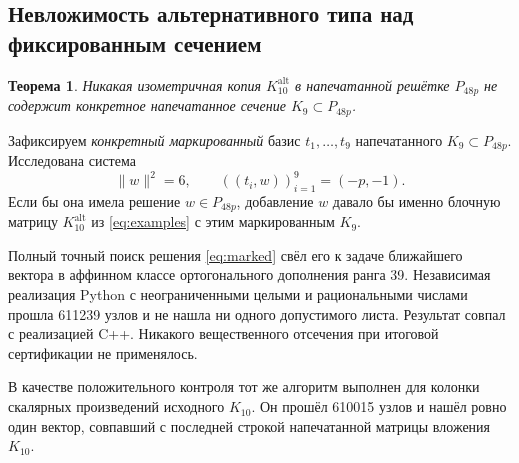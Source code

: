 \documentclass[11pt,a4paper]{article}
\newtheorem{theorem}{Теорема}[section]
\theoremstyle{remark}\newtheorem{remark}[theorem]{Замечание}
\newcommand{\Kalt}{K_{10}^{\mathrm{alt}}}
\begin{document}
\subsection{Невложимость альтернативного типа над фиксированным сечением}

\begin{theorem}\label{thm:nonembedding}
Никакая изометричная копия $\Kalt$ в напечатанной решётке $P_{48p}$ не содержит конкретное напечатанное сечение $K_9\subset P_{48p}$.
\end{theorem}

Зафиксируем \emph{конкретный маркированный} базис $t_1,\ldots,t_9$ напечатанного $K_9\subset P_{48p}$. Исследована система
\begin{equation}\label{eq:marked}
\|w\|^2=6,\qquad ((t_i,w))_{i=1}^9=(-p,-1).
\end{equation}
Если бы она имела решение $w\in P_{48p}$, добавление $w$ давало бы именно блочную матрицу $\Kalt$ из \eqref{eq:examples} с этим маркированным $K_9$.

Полный точный поиск решения \eqref{eq:marked} свёл его к задаче ближайшего вектора в аффинном классе ортогонального дополнения ранга 39. Независимая реализация Python с неограниченными целыми и рациональными числами прошла 611239 узлов и не нашла ни одного допустимого листа. Результат совпал с реализацией C++. Никакого вещественного отсечения при итоговой сертификации не применялось.

В качестве положительного контроля тот же алгоритм выполнен для колонки скалярных произведений исходного $K_{10}$. Он прошёл 610015 узлов и нашёл ровно один вектор, совпавший с последней строкой напечатанной матрицы вложения $K_{10}$.
\end{document}
